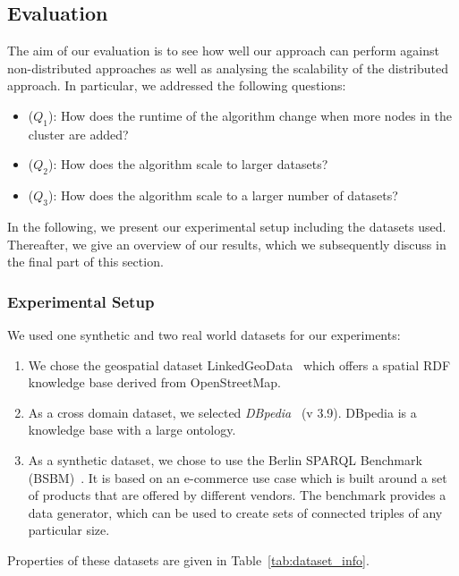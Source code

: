 \subsection{Evaluation}
\label{sec:evaluation}
The aim of our evaluation is to see how well our approach can perform against non-distributed approaches as well as analysing the scalability of the distributed approach. 
In particular, we addressed the following questions:   
\begin{itemize}
    \item ($Q_1$): How does the runtime of the algorithm change when more nodes in the cluster are added?
    \item ($Q_2$): How does the algorithm scale to larger datasets?
    \item ($Q_3$): How does the algorithm scale to a larger number of datasets?
\end{itemize}

In the following, we present our experimental setup including the datasets used. Thereafter, we give an overview of our results, which we subsequently discuss in the final part of this section.

\subsubsection{Experimental Setup}

We used one synthetic and two real world datasets for our experiments:
\begin{enumerate}
 
 \item We chose the geospatial dataset LinkedGeoData~\cite{SLHA11} which offers a spatial RDF knowledge base derived from OpenStreetMap.
 
 \item As a cross domain dataset, we selected \emph{DBpedia}~\cite{dbpedia-swj} (v 3.9). DBpedia is a knowledge base with a large ontology.
 
 \item As a synthetic dataset, we chose to use the Berlin SPARQL Benchmark (BSBM)~\cite{Bizer2009TheBS}.
 It is based on an e-commerce use case which is built around a set of products that are offered by different vendors.
 The benchmark provides a data generator, which can be used to create sets of connected triples of any particular size.
 
\end{enumerate}

Properties of these datasets are given in Table~\ref{tab:dataset_info}.

